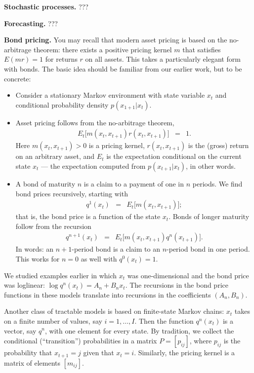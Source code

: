 \documentclass[11pt]{article}
\begin{document}
{\bf Stochastic processes.\/}
???

{\bf Forecasting.\/} 
???


{\bf Bond pricing.\/}
You may recall that modern asset pricing is based on the no-arbitrage theorem:
there exists a positive pricing kernel $m$ that satisfies
$ E(mr) = 1$ for returns $r$ on all assets.
This takes a particularly elegant form with bonds.
The basic idea should be familiar from our earlier work,
but to be concrete:
%
\begin{itemize}
\item Consider a stationary Markov environment
with state variable $x_t$ and conditional probability density
$ p(x_{1+1} | x_t) $.
\item Asset pricing follows from the no-arbitrage theorem,
\begin{eqnarray*}
    E_t \big[ m(x_t,x_{t+1}) r(x_t,x_{t+1}) \big] &=& 1.
\end{eqnarray*}
Here $ m(x_t,x_{t+1})>0$ is a pricing kernel,
$r(x_t,x_{t+1})$ is the (gross) return on an arbitrary asset,
and $E_t$ is the expectation conditional on the current state $x_t$
--- the expectation computed from $p(x_{t+1} | x_t)$, in other words.

\item A bond of maturity $n$ is a claim to a payment of one in $n$ periods.
We find bond prices recursively, starting with
\begin{eqnarray*}
    q^1(x_t) &=& E_t \big[ m(x_t,x_{t+1}) \big] ;
\end{eqnarray*}
that is, the bond price is a function of the state $x_t$.
Bonds of longer maturity follow from the recursion
\begin{eqnarray}
    q^{n+1}(x_t) &=& E_t \big[ m(x_t,x_{t+1}) q^n(x_{t+1})\big] .
    \label{eq:recursion-bond}
\end{eqnarray}
In words:  an $n+1$-period bond is a claim to an $n$-period bond in one period.
This works for $n=0$ as well with $ q^0(x_t) = 1$.
\end{itemize}
We studied examples earlier in which $x_t$ was one-dimensional
and the bond price was loglinear:  $ \log q^n(x_t) = A_n + B_n x_t$.
The recursions in the bond price functions in these models translate into recursions
in the coefficients $ (A_n,B_n) $.

Another class of tractable models is based on finite-state Markov chains:
$x_t$ takes on a finite number of values, say $i = 1,\ldots, I$.
Then the function $q^n(x_t)$ is a vector, say $q^n$,
with one element for every state.
By tradition, we collect the conditional (``transition'') probabilities
in a matrix $P = [p_{ij}]$,
where $p_{ij}$ is the probability that $x_{t+1} = j$ given that $x_t = i$.
Similarly, the pricing kernel is a matrix of elements $[m_{ij}]$.
\end{document}
